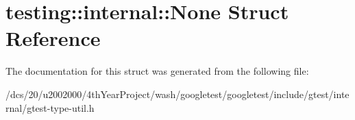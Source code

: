 \hypertarget{structtesting_1_1internal_1_1None}{}\section{testing\+:\+:internal\+:\+:None Struct Reference}
\label{structtesting_1_1internal_1_1None}


The documentation for this struct was generated from the following file\+:\begin{DoxyCompactItemize}
\item 
/dcs/20/u2002000/4th\+Year\+Project/wash/googletest/googletest/include/gtest/internal/gtest-\/type-\/util.\+h\end{DoxyCompactItemize}
